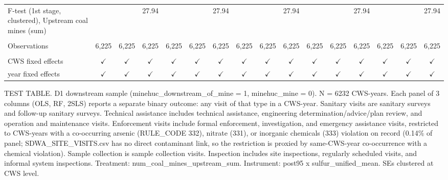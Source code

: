 \begin{table}[htbp]
\begin{adjustbox}{width = \textwidth, center}
\begin{tabular}{lccccccccccccccc}
         F-test (1st stage, clustered), Upstream coal mines (sum) &               &                 & 27.94          &               &               & 27.94         &               &               & 27.94         &               &               & 27.94         &               &               & 27.94\\  
         
          \\
         
         Observations                                             & 6,225         & 6,225           & 6,225          & 6,225         & 6,225         & 6,225         & 6,225         & 6,225         & 6,225         & 6,225         & 6,225         & 6,225         & 6,225         & 6,225         & 6,225\\  
         
          \\
         
         CWS fixed effects                                        & $\checkmark$  & $\checkmark$    & $\checkmark$   & $\checkmark$  & $\checkmark$  & $\checkmark$  & $\checkmark$  & $\checkmark$  & $\checkmark$  & $\checkmark$  & $\checkmark$  & $\checkmark$  & $\checkmark$  & $\checkmark$  & $\checkmark$\\   
         year fixed effects                                       & $\checkmark$  & $\checkmark$    & $\checkmark$   & $\checkmark$  & $\checkmark$  & $\checkmark$  & $\checkmark$  & $\checkmark$  & $\checkmark$  & $\checkmark$  & $\checkmark$  & $\checkmark$  & $\checkmark$  & $\checkmark$  & $\checkmark$\\   
         
         \bottomrule
         
      \end{tabular}
      
      
      
   \end{adjustbox}
      {\tiny\linespread{1}\selectfont \par \raggedright 
   TEST TABLE. D1 downstream sample (minehuc\_downstream\_of\_mine = 1, minehuc\_mine = 0). N = 6232 CWS-years. Each panel of 3 columns (OLS, RF, 2SLS) reports a separate binary outcome: any visit of that type in a CWS-year. Sanitary visits are sanitary surveys and follow-up sanitary surveys. Technical assistance includes technical assistance, engineering determination/advice/plan review, and operation and maintenance visits. Enforcement visits include formal enforcement, investigation, and emergency assistance visits, restricted to CWS-years with a co-occurring arsenic (RULE\_CODE 332), nitrate (331), or inorganic chemicals (333) violation on record (0.14\% of panel; SDWA\_SITE\_VISITS.csv has no direct contaminant link, so the restriction is proxied by same-CWS-year co-occurrence with a chemical violation). Sample collection is sample collection visits. Inspection includes site inspections, regularly scheduled visits, and informal system inspections. Treatment: num\_coal\_mines\_upstream\_sum. Instrument: post95 x sulfur\_unified\_mean. SEs clustered at CWS level.}
   

\end{table}
